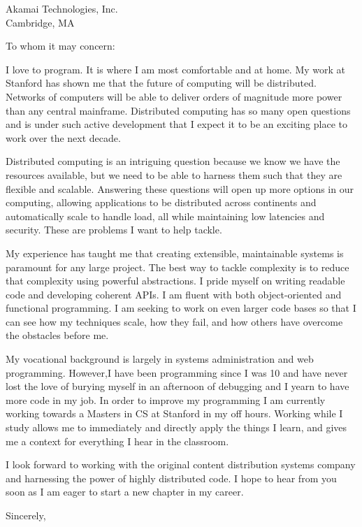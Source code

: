 \documentclass{letter}[11pt]
\begin{document}
\begin{letter}{Akamai Technologies, Inc.\\
Cambridge, MA
}

\opening{To whom it may concern:}

I love to program.  It is where I am most comfortable and at home.  My work at Stanford has shown me that the future of computing will be distributed.  Networks of computers will be able to deliver orders of magnitude more power than any central mainframe.  Distributed computing has so many open questions and is under such active development that I expect it to be an exciting place to work over the next decade.

Distributed computing is an intriguing question because we know we have the resources available, but we need to be able to harness them such that they are flexible and scalable.  Answering these questions will open up more options in our computing, allowing applications to be distributed across continents and automatically scale to handle load, all while maintaining low latencies and security.  These are problems I want to help tackle.

My experience has taught me that creating extensible, maintainable systems is paramount for any large project.  The best way to tackle complexity is to reduce that complexity using powerful abstractions.  I pride myself on writing readable code and developing coherent APIs.  I am fluent with both object-oriented and functional programming.  I am seeking to work on even larger code bases so that I can see how my techniques scale, how they fail, and how others have overcome the obstacles before me.

My vocational background is largely in systems administration and web programming.  However,I have been programming since I was 10 and have never lost the love of burying myself in an afternoon of debugging and I yearn to have more code in my job.  In order to improve my programming I am currently working towards a Masters in CS at Stanford in my off hours.  Working while I study allows me to immediately and directly apply the things I learn, and gives me a context for everything I hear in the classroom.

I look forward to working with the original content distribution systems company and harnessing the power of highly distributed code.  I hope to hear from you soon as I am eager to start a new chapter in my career.

\closing{Sincerely,}
\end{letter}
\end{document}
